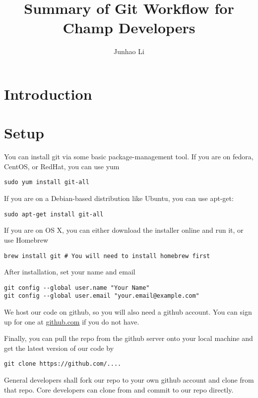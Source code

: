 \documentclass[runningheads,letterpaper]{llncs}
\begin{document}
\mainmatter
\title{Summary of Git Workflow for Champ Developers}

\author{Junhao Li}

\maketitle

\section*{Introduction}




\section{Setup}

You can install git via some basic package-management tool.
If you are on fedora, CentOS, or RedHat, you can use yum
\begin{verbatim}
sudo yum install git-all
\end{verbatim}
If you are on a Debian-based distribution like Ubuntu, you can use apt-get:
\begin{verbatim}
sudo apt-get install git-all
\end{verbatim}
If you are on OS X, you can either download the installer online and run it, or use Homebrew
\begin{verbatim}
brew install git # You will need to install homebrew first
\end{verbatim}

After installation, set your name and email
\begin{verbatim}
git config --global user.name "Your Name"
git config --global user.email "your.email@example.com"
\end{verbatim}

We host our code on github, so you will also need a github account.
You can sign up for one at \url{github.com} if you do not have.

Finally, you can pull the repo from the github server onto your local machine and get the latest version of our code by
\begin{verbatim}
git clone https://github.com/....
\end{verbatim}
General developers shall fork our repo to your own github account and clone from that repo.
Core developers can clone from and commit to our repo directly.
\end{document}
